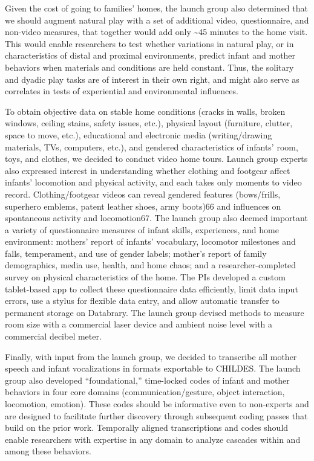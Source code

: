 \documentclass[english,man]{apa6}
\theoremstyle{definition}
\theoremstyle{definition}
\theoremstyle{definition}
\theoremstyle{remark}
\begin{document}
Given the cost of going to families' homes, the launch group also
determined that we should augment natural play with a set of additional
video, questionnaire, and non-video measures, that together would add
only \textasciitilde{}45 minutes to the home visit. This would enable
researchers to test whether variations in natural play, or in
characteristics of distal and proximal environments, predict infant and
mother behaviors when materials and conditions are held constant. Thus,
the solitary and dyadic play tasks are of interest in their own right,
and might also serve as correlates in tests of experiential and
environmental influences.

To obtain objective data on stable home conditions (cracks in walls,
broken windows, ceiling stains, safety issues, etc.), physical layout
(furniture, clutter, space to move, etc.), educational and electronic
media (writing/drawing materials, TVs, computers, etc.), and gendered
characteristics of infants' room, toys, and clothes, we decided to
conduct video home tours. Launch group experts also expressed interest
in understanding whether clothing and footgear affect infants'
locomotion and physical activity, and each takes only moments to video
record. Clothing/footgear videos can reveal gendered features
(bows/frills, superhero emblems, patent leather shoes, army boots)66 and
influences on spontaneous activity and locomotion67. The launch group
also deemed important a variety of questionnaire measures of infant
skills, experiences, and home environment: mothers' report of infants'
vocabulary, locomotor milestones and falls, temperament, and use of
gender labels; mother's report of family demographics, media use,
health, and home chaos; and a researcher-completed survey on physical
characteristics of the home. The PIs developed a custom tablet-based app
to collect these questionnaire data efficiently, limit data input
errors, use a stylus for flexible data entry, and allow automatic
transfer to permanent storage on Databrary. The launch group devised
methods to measure room size with a commercial laser device and ambient
noise level with a commercial decibel meter.

Finally, with input from the launch group, we decided to transcribe all
mother speech and infant vocalizations in formats exportable to CHILDES.
The launch group also developed \enquote{foundational,} time-locked
codes of infant and mother behaviors in four core domains
(communication/gesture, object interaction, locomotion, emotion). These
codes should be informative even to non-experts and are designed to
facilitate further discovery through subsequent coding passes that build
on the prior work. Temporally aligned transcriptions and codes should
enable researchers with expertise in any domain to analyze cascades
within and among these behaviors.
\end{document}
